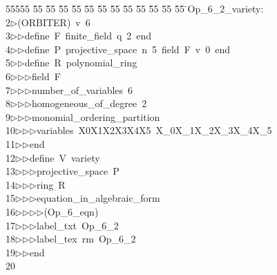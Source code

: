 %
%
\begin{tabbing}
55555 \= 55 \= 55 \= 55 \= 55 \= 55 \= 55 \= 55 \= 55 \= 55 \= 55 \= 55 \= 55 \= \>Op\_6\_2\_variety:\\[0pt]
2\>$\triangleright$\>(ORBITER)\ v\ 6\ \\[0pt]
3\>$\triangleright$\>$\triangleright$\>define\ F\ finite\_field\ q\ 2\ end\ \\[0pt]
4\>$\triangleright$\>$\triangleright$\>define\ P\ projective\_space\ n\ 5\ field\ F\ v\ 0\ end\ \\[0pt]
5\>$\triangleright$\>$\triangleright$\>define\ R\ polynomial\_ring\ \\[0pt]
6\>$\triangleright$\>$\triangleright$\>$\triangleright$\>field\ F\ \\[0pt]
7\>$\triangleright$\>$\triangleright$\>$\triangleright$\>number\_of\_variables\ 6\ \\[0pt]
8\>$\triangleright$\>$\triangleright$\>$\triangleright$\>homogeneous\_of\_degree\ 2\ \\[0pt]
9\>$\triangleright$\>$\triangleright$\>$\triangleright$\>monomial\_ordering\_partition\ \\[0pt]
10\>$\triangleright$\>$\triangleright$\>$\triangleright$\>variables\ X0X1X2X3X4X5\ X\_0X\_1X\_2X\_3X\_4X\_5\ \\[0pt]
11\>$\triangleright$\>$\triangleright$\>end\ \\[0pt]
12\>$\triangleright$\>$\triangleright$\>define\ V\ variety\ \\[0pt]
13\>$\triangleright$\>$\triangleright$\>$\triangleright$\>projective\_space\ P\ \\[0pt]
14\>$\triangleright$\>$\triangleright$\>$\triangleright$\>ring\ R\ \\[0pt]
15\>$\triangleright$\>$\triangleright$\>$\triangleright$\>equation\_in\_algebraic\_form\ \\[0pt]
16\>$\triangleright$\>$\triangleright$\>$\triangleright$\>$\triangleright$\>(Op\_6\_eqn)\ \\[0pt]
17\>$\triangleright$\>$\triangleright$\>$\triangleright$\>label\_txt\ Op\_6\_2\ \\[0pt]
18\>$\triangleright$\>$\triangleright$\>$\triangleright$\>label\_tex\ rm\ Op\_6\_2\ \\[0pt]
19\>$\triangleright$\>$\triangleright$\>end\\[0pt]
20\>\end{tabbing}
